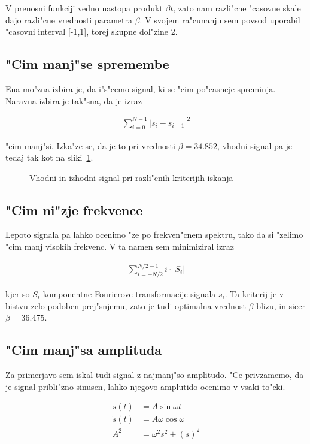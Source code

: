 \documentclass[a4paper,10pt]{article}
\begin{document}
V prenosni funkciji vedno nastopa produkt $\beta t$, zato nam razli"cne "casovne skale dajo razli"cne vrednosti parametra $\beta$. V svojem ra"cunanju sem povsod uporabil "casovni interval [-1,1], torej skupne dol"zine 2. 

\subsection{"Cim manj"se spremembe}

Ena mo"zna izbira je, da i"s"cemo signal, ki se "cim po"casneje spreminja. Naravna izbira je tak"sna, da je izraz

\begin{align}
  \sum_{i=0}^{N-1} \left| s_i - s_{i-1}\right|^2
\end{align}

"cim manj"si. Izka"ze se, da je to pri vrednosti $\beta = 34.852$, vhodni signal pa je tedaj tak kot na sliki~\ref{fig:dekon-signal}. 

\begin{figure}[h]
 
\caption{Vhodni in izhodni signal pri razli"cnih kriterijih iskanja}
\label{fig:dekon-signal}
\end{figure}

\subsection{"Cim ni"zje frekvence}

Lepoto signala pa lahko ocenimo "ze po frekven"cnem spektru, tako da si "zelimo "cim manj visokih frekvenc. V ta namen sem minimiziral izraz

\begin{align}
 \sum_{i=-N/2}^{N/2-1} i\cdot|S_i|
\end{align}

kjer so $S_i$ komponentne Fourierove transformacije signala $s_i$. Ta kriterij je v bistvu zelo podoben prej"snjemu, zato je tudi optimalna vrednost $\beta$ blizu, in sicer $\beta = 36.475$. 

\subsection{"Cim manj"sa amplituda}

Za primerjavo sem iskal tudi signal z najmanj"so amplitudo. "Ce privzamemo, da je signal pribli"zno sinusen, lahko njegovo amplutido ocenimo v vsaki to"cki. 

\begin{align}
 s(t) &= A\sin \omega t \\
 \dot s(t) &= A\omega \cos \omega \\ 
 A^2 &= \omega^2 s^2 + (\dot{s})^2
\end{align}
\end{document}
